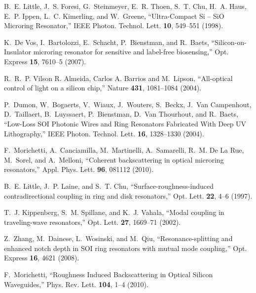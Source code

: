\documentclass[10pt,letterpaper]{article}
\begin{document}
%
%
\begin{thebibliography}{10}
\newcommand{\enquote}[1]{``#1''}

B.~E. Little, J.~S. Foresi, G.~Steinmeyer, E.~R. Thoen, S.~T. Chu, H.~A. Haus,
  E.~P. Ippen, L.~C. Kimerling, and W.~Greene, \enquote{{Ultra-Compact Si –
  SiO Microring Resonator},} IEEE Photon. Technol. Lett. \textbf{10}, 549--551 (1998).

K.~{De Vos}, I.~Bartolozzi, E.~Schacht, P.~Bienstman, and R.~Baets,
  \enquote{{Silicon-on-Insulator microring resonator for sensitive and
  label-free biosensing},} Opt. Express \textbf{15}, 7610--5 (2007).

R.~R.~P. {Vilson R. Almeida, Carlos A. Barrios} and M.~Lipson,
  \enquote{{All-optical control of light on a silicon chip},} Nature
  \textbf{431}, 1081--1084 (2004).

P.~Dumon, W.~Bogaerts, V.~Wiaux, J.~Wouters, S.~Beckx, J.~{Van Campenhout},
  D.~Taillaert, B.~Luyssaert, P.~Bienstman, D.~{Van Thourhout}, and R.~Baets,
  \enquote{{Low-Loss SOI Photonic Wires and Ring Resonators Fabricated With
  Deep UV Lithography},} IEEE Photon. Technol. Lett. \textbf{16},
  1328--1330 (2004).

F.~Morichetti, A.~Canciamilla, M.~Martinelli, A.~Samarelli, R.~M. {De La Rue},
  M.~Sorel, and A.~Melloni, \enquote{{Coherent backscattering in optical
  microring resonators},} Appl. Phys. Lett. \textbf{96}, 081112 (2010).

B.~E. Little, J.~P. Laine, and S.~T. Chu, \enquote{{Surface-roughness-induced
  contradirectional coupling in ring and disk resonators},} Opt. Lett.
  \textbf{22}, 4--6 (1997).

T.~J. Kippenberg, S.~M. Spillane, and K.~J. Vahala, \enquote{{Modal coupling in
  traveling-wave resonators},} Opt. Lett. \textbf{27}, 1669--71 (2002).

Z.~Zhang, M.~Dainese, L.~Wosinski, and M.~Qiu, \enquote{{Resonance-splitting
  and enhanced notch depth in SOI ring resonators with mutual mode coupling},}
  Opt. Express \textbf{16}, 4621 (2008).

F.~Morichetti, \enquote{{Roughness Induced Backscattering in Optical Silicon
  Waveguides},} Phys. Rev. Lett. \textbf{104}, 1--4 (2010).


\end{thebibliography}
\end{document}
